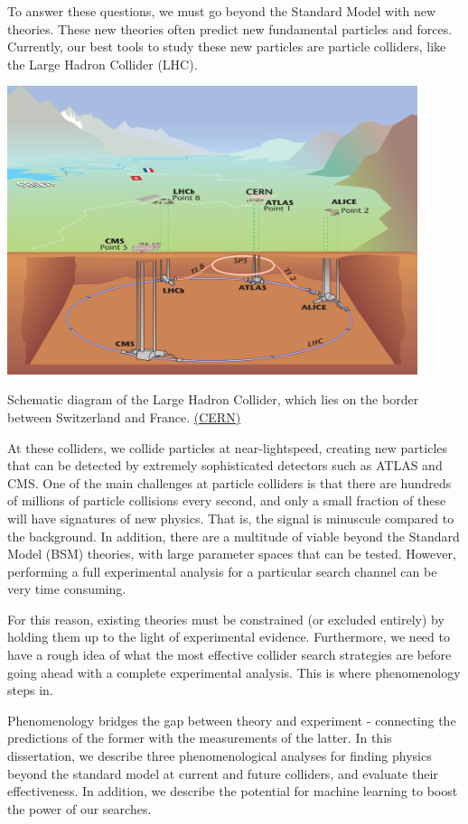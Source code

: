 To answer these questions, we must go beyond the Standard Model with new theories. These new theories often predict new fundamental particles and forces. Currently, our best tools to study these new particles are particle colliders, like the Large Hadron Collider (LHC).

\begin{marginfigure}
  \centering
  \includegraphics[width=0.9\textwidth]{images/LHC}
  \caption{Schematic diagram of the Large Hadron Collider, which lies on the border between Switzerland and France. \href{http://cds.cern.ch/journal/CERNBulletin/2008/38/News\%20Articles/1125888?ln=en}{(CERN)}}
\end{marginfigure}

At these colliders, we collide particles at near-lightspeed, creating new particles that can be detected by extremely sophisticated detectors such as ATLAS and CMS. One of the main challenges at particle colliders is that there are hundreds of millions of particle collisions every second, and only a small fraction of these will have signatures of new physics. That is, the signal is minuscule compared to the background. In addition, there are a multitude of viable beyond the Standard Model (BSM) theories, with large parameter spaces that can be tested. However, performing a full experimental analysis for a particular search channel can be very time consuming.

For this reason, existing theories must be constrained (or excluded entirely) by holding them up to the light of experimental evidence. Furthermore, we need to have a rough idea of what the most effective collider search strategies are before going ahead with a complete experimental analysis. This is where phenomenology steps in.

Phenomenology bridges the gap between theory and experiment - connecting the predictions of the former with the measurements of the latter. In this dissertation, we describe three phenomenological analyses for finding physics beyond the standard model at current and future colliders, and evaluate their effectiveness. In addition, we describe the potential for machine learning to boost the power of our searches.
